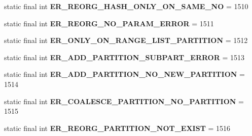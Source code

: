 \begin{DoxyCompactItemize}
static final int {\bfseries E\+R\+\_\+\+R\+E\+O\+R\+G\+\_\+\+H\+A\+S\+H\+\_\+\+O\+N\+L\+Y\+\_\+\+O\+N\+\_\+\+S\+A\+M\+E\+\_\+\+NO} = 1510
\item 
\mbox{\label{classcom_1_1mysql_1_1cj_1_1exceptions_1_1_mysql_error_numbers_a605c51e09061229700ae72e882bf12f3}} 
static final int {\bfseries E\+R\+\_\+\+R\+E\+O\+R\+G\+\_\+\+N\+O\+\_\+\+P\+A\+R\+A\+M\+\_\+\+E\+R\+R\+OR} = 1511
\item 
\mbox{\label{classcom_1_1mysql_1_1cj_1_1exceptions_1_1_mysql_error_numbers_a4bca731beae4e1ed2fb0f1bafdfaf0c0}} 
static final int {\bfseries E\+R\+\_\+\+O\+N\+L\+Y\+\_\+\+O\+N\+\_\+\+R\+A\+N\+G\+E\+\_\+\+L\+I\+S\+T\+\_\+\+P\+A\+R\+T\+I\+T\+I\+ON} = 1512
\item 
\mbox{\label{classcom_1_1mysql_1_1cj_1_1exceptions_1_1_mysql_error_numbers_a0417e35a6ab6d47f16a4c4e4976f988c}} 
static final int {\bfseries E\+R\+\_\+\+A\+D\+D\+\_\+\+P\+A\+R\+T\+I\+T\+I\+O\+N\+\_\+\+S\+U\+B\+P\+A\+R\+T\+\_\+\+E\+R\+R\+OR} = 1513
\item 
\mbox{\label{classcom_1_1mysql_1_1cj_1_1exceptions_1_1_mysql_error_numbers_a85654018c8e5c3956c128cc3dc8e89d6}} 
static final int {\bfseries E\+R\+\_\+\+A\+D\+D\+\_\+\+P\+A\+R\+T\+I\+T\+I\+O\+N\+\_\+\+N\+O\+\_\+\+N\+E\+W\+\_\+\+P\+A\+R\+T\+I\+T\+I\+ON} = 1514
\item 
\mbox{\label{classcom_1_1mysql_1_1cj_1_1exceptions_1_1_mysql_error_numbers_ab420753954c59c1fe210973e7e8be5e3}} 
static final int {\bfseries E\+R\+\_\+\+C\+O\+A\+L\+E\+S\+C\+E\+\_\+\+P\+A\+R\+T\+I\+T\+I\+O\+N\+\_\+\+N\+O\+\_\+\+P\+A\+R\+T\+I\+T\+I\+ON} = 1515
\item 
\mbox{\label{classcom_1_1mysql_1_1cj_1_1exceptions_1_1_mysql_error_numbers_a85c86749c8403a0ebfaebb370ee9d566}} 
static final int {\bfseries E\+R\+\_\+\+R\+E\+O\+R\+G\+\_\+\+P\+A\+R\+T\+I\+T\+I\+O\+N\+\_\+\+N\+O\+T\+\_\+\+E\+X\+I\+ST} = 1516
\item 

\end{DoxyCompactItemize}
